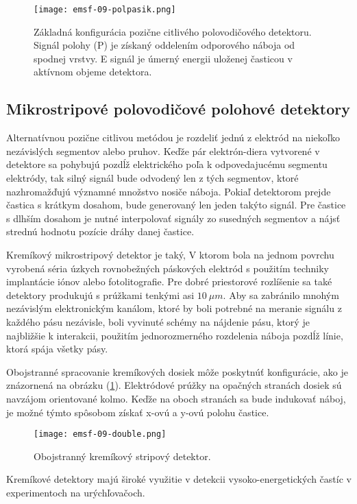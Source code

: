\documentclass[../../main.tex]{subfiles}
\begin{document}
\begin{figure}[!h]
\texttt{[image: emsf-09-polpasik.png]}
\centering
\caption{Základná konfigurácia pozične citlivého polovodičového detektoru. Signál polohy (P) je získaný oddelením odporového náboja od spodnej vrstvy. E signál je úmerný energii uloženej časticou v aktívnom objeme detektora.}
\label{em9:fig:polpasik}
\end{figure}

\subsection{Mikrostripové polovodičové polohové detektory} 
Alternatívnou pozične citlivou metódou je rozdeliť jednú z elektród na niekoľko nezávislých segmentov alebo pruhov. Keďže pár elektrón-diera vytvorené v detektore sa pohybujú pozdĺž elektrického poľa k odpovedajucému segmentu elektródy, tak silný signál bude odvodený len z tých segmentov, ktoré nazhromažďujú významné množstvo nosiče náboja.
Pokiaľ detektorom prejde častica s krátkym dosahom, bude generovaný len jeden takýto signál. Pre častice s dlhším dosahom je nutné interpolovať signály zo susedných segmentov a nájsť strednú hodnotu pozície dráhy danej častice.

Kremíkový mikrostripový detektor je taký, V ktorom bola na jednom povrchu vyrobená séria úzkych rovnobežných páskových elektród s použitím techniky implantácie iónov alebo fotolitografie. Pre dobré priestorové rozlíšenie sa také detektory produkujú s prúžkami tenkými asi $10\: \mu m$. Aby sa zabránilo mnohým nezávislým elektronickým kanálom, ktoré by boli potrebné na meranie signálu z každého pásu nezávisle, boli vyvinuté schémy na nájdenie pásu, ktorý je najbližšie k interakcii, použitím jednorozmerného rozdelenia náboja pozdĺž línie, ktorá spája všetky pásy.

Obojstranné spracovanie kremíkových dosiek môže poskytnúť konfigurácie, ako je znázornená na obrázku (\ref{em9:fig:polpasik}). Elektródové prúžky na opačných stranách dosiek sú navzájom orientované kolmo. Keďže na oboch stranách sa bude indukovať náboj, je možné týmto spôsobom získať x-ovú a y-ovú polohu častice.

\begin{figure}[!h]
\texttt{[image: emsf-09-double.png]}
\centering
\caption{Obojstranný kremíkový stripový detektor.}
\label{em9:fig:double}
\end{figure}

Kremíkové detektory majú široké využitie v detekcii vysoko-energetických častíc v experimentoch na urýchľovačoch.
\end{document}
